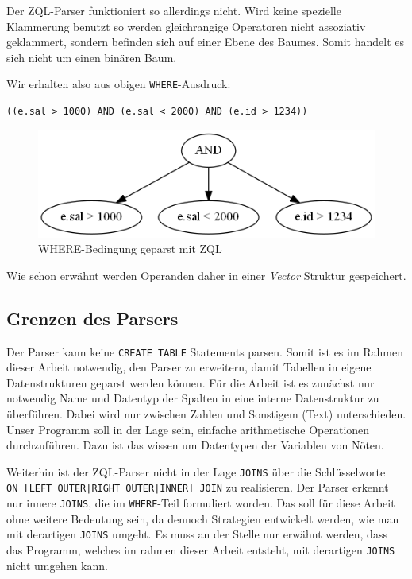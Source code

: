 Der ZQL-Parser funktioniert so allerdings nicht. Wird keine spezielle Klammerung benutzt so werden gleichrangige Operatoren nicht assoziativ geklammert, sondern befinden sich auf einer Ebene des Baumes. Somit handelt es sich nicht um einen binären Baum. 

Wir erhalten also aus obigen \verb|WHERE|-Ausdruck:
\begin{verbatim}
((e.sal > 1000) AND (e.sal < 2000) AND (e.id > 1234))
\end{verbatim}

\begin{figure}
\includegraphics[scale=0.7]{Bilder/with_zql.png}
\caption{WHERE-Bedingung geparst mit ZQL}
\end{figure}

Wie schon erwähnt werden Operanden daher in einer \textit{Vector} Struktur gespeichert.

\subsection{Grenzen des Parsers}

Der Parser kann keine \verb|CREATE TABLE| Statements parsen. Somit ist es im Rahmen dieser Arbeit notwendig, den Parser zu erweitern, damit Tabellen in eigene Datenstrukturen geparst werden können. Für die Arbeit ist es zunächst nur notwendig Name und Datentyp der Spalten in eine interne Datenstruktur zu überführen. Dabei wird nur zwischen Zahlen und Sonstigem (Text) unterschieden. Unser Programm soll in der Lage sein, einfache arithmetische Operationen durchzuführen. Dazu ist das wissen um Datentypen der Variablen von Nöten.

Weiterhin ist der ZQL-Parser nicht in der Lage \verb|JOINS| über die Schlüsselworte \\\verb#ON [LEFT OUTER|RIGHT OUTER|INNER] JOIN# zu realisieren. Der Parser erkennt nur innere \verb|JOINS|, die im \verb|WHERE|-Teil formuliert worden. Das soll für diese Arbeit ohne weitere Bedeutung sein, da dennoch Strategien entwickelt werden, wie man mit derartigen \verb|JOINS| umgeht. Es muss an der Stelle nur erwähnt werden, dass das Programm, welches im rahmen dieser Arbeit entsteht, mit derartigen \verb|JOINS| nicht umgehen kann.

